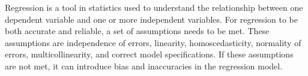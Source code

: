 
Regression is a tool in statistics used to understand the relationship between one dependent variable and one or more independent variables. For regression to be both accurate and reliable, a set of assumptions needs to be met. These assumptions are independence of errors, linearity, homoscedasticity, normality of errors, multicollinearity, and correct model specifications. If these assumptions are not met, it can introduce bias and inaccuracies in the regression model.